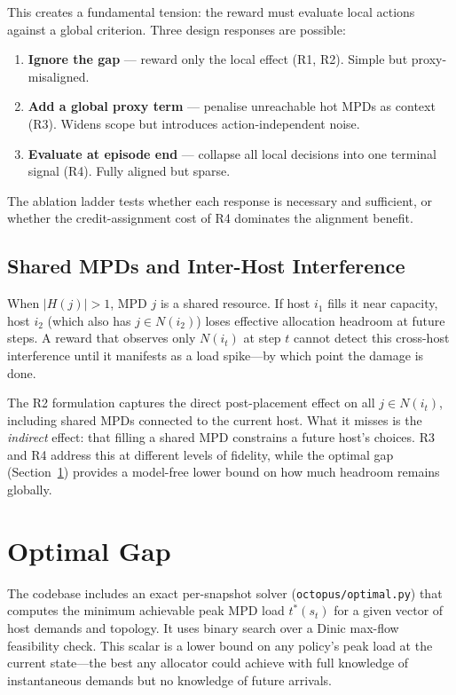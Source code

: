 \documentclass[11pt]{article}
\begin{document}
This creates a fundamental tension: the reward must evaluate local actions
against a global criterion.  Three design responses are possible:
\begin{enumerate}
  \item \textbf{Ignore the gap} --- reward only the local effect (R1, R2).
        Simple but proxy-misaligned.
  \item \textbf{Add a global proxy term} --- penalise unreachable hot MPDs
        as context (R3).  Widens scope but introduces action-independent
        noise.
  \item \textbf{Evaluate at episode end} --- collapse all local decisions
        into one terminal signal (R4).  Fully aligned but sparse.
\end{enumerate}
The ablation ladder tests whether each response is necessary and
sufficient, or whether the credit-assignment cost of R4 dominates the
alignment benefit.

\subsection{Shared MPDs and Inter-Host Interference}

When $|H(j)| > 1$, MPD $j$ is a shared resource.  If host $i_1$ fills it
near capacity, host $i_2$ (which also has $j \in N(i_2)$) loses effective
allocation headroom at future steps.  A reward that observes only
$N(i_t)$ at step $t$ cannot detect this cross-host interference until it
manifests as a load spike---by which point the damage is done.

The R2 formulation captures the direct post-placement effect on all
$j \in N(i_t)$, including shared MPDs connected to the current host.  What
it misses is the \emph{indirect} effect: that filling a shared MPD
constrains a future host's choices.  R3 and R4 address this at different
levels of fidelity, while the optimal gap (Section~\ref{sec:optgap})
provides a model-free lower bound on how much headroom remains globally.

\section{Optimal Gap}
\label{sec:optgap}

The codebase includes an exact per-snapshot solver
(\texttt{octopus/optimal.py}) that computes the minimum achievable peak
MPD load $t^*(s_t)$ for a given vector of host demands and topology.
It uses binary search over a Dinic max-flow feasibility check.
This scalar is a lower bound on any policy's peak load at the current
state---the best any allocator could achieve with full knowledge of
instantaneous demands but no knowledge of future arrivals.
\end{document}
